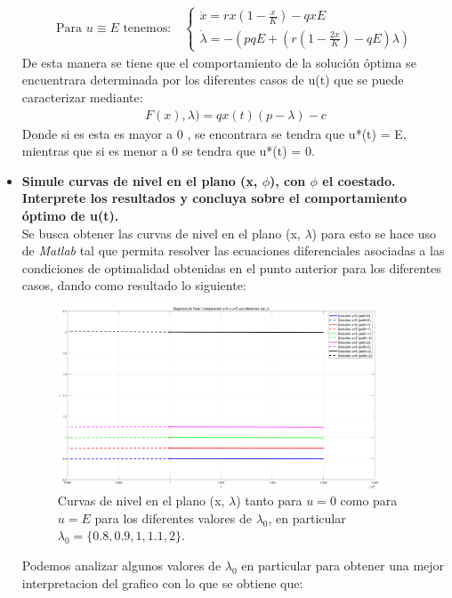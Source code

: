 \begin{itemize}
\begin{align}
    \text{Para } u \equiv E \text{ tenemos:} \quad
    \begin{cases}
        \dot{x} = r x \left(1 - \frac{x}{K}\right) - q x E \\
        \dot{\lambda} = -(p q E + \left(r \left(1 - \frac{2x}{K}\right) - q E\right)\lambda)
    \end{cases}
\end{align}
De esta manera se tiene que el comportamiento de la solución óptima se encuentrara determinada por los diferentes casos de u(t) que se puede caracterizar mediante:
\begin{align}
	F(x),\lambda)= qx(t)(p-\lambda) -c
\end{align}
Donde si es esta es mayor a 0 , se encontrara se tendra que u*(t) = E, mientras que si es menor a 0 se tendra que u*(t) = 0.
	\item \textbf{Simule curvas de nivel en el plano (x, $\phi$), con $\phi$ el coestado. Interprete los resultados y concluya sobre el comportamiento óptimo de u(t).}\\
Se busca obtener las curvas de nivel en el plano (x, $\lambda$) para esto se hace uso de \textit{Matlab} tal que permita resolver las ecuaciones diferenciales asociadas a las condiciones de optimalidad obtenidas en el punto anterior para los diferentes casos, dando como resultado lo siguiente:
\begin{figure}[H]
	\centering
	\includegraphics[width=0.9\textwidth]{img/[P2] Curvas de nivel.png}
	\caption{Curvas de nivel en el plano (x, $\lambda$) tanto para $u=0$ como para $u=E$ para los diferentes valores de $\lambda_{0}$, en particular $\lambda_{0} = \{0.8, 0.9, 1, 1.1, 2\}$.}
	\label{img:curvas-nivel}
\end{figure}
Podemos analizar algunos valores de $\lambda_0$ en particular para obtener una mejor interpretacion del grafico con lo que se obtiene que:

\end{itemize}

